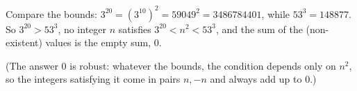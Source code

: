 Compare the bounds: $3^{20}=\left(3^{10}\right)^2=59049^2=3486784401$, while $53^3=148877$. So $3^{20}>53^3$, no integer $n$ satisfies $3^{20}<n^2<53^3$, and the sum of the (non-existent) values is the empty sum, $\boxed{0}$.

(The answer $0$ is robust: whatever the bounds, the condition depends only on $n^2$, so the integers satisfying it come in pairs $n,-n$ and always add up to $0$.)

